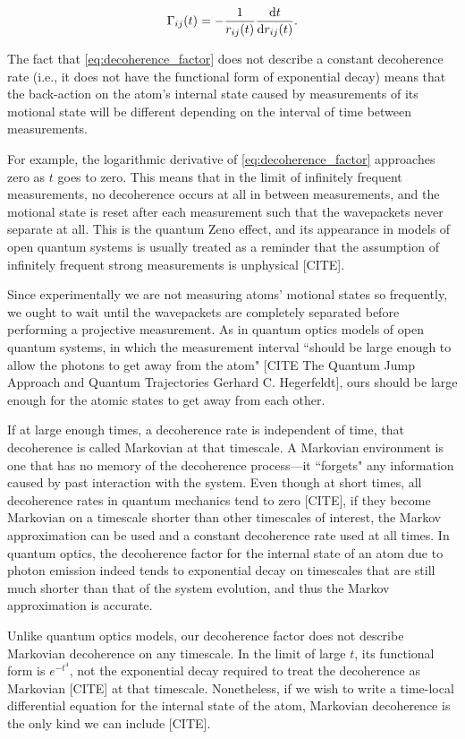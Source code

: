 \begin{align}
\Gamma_{ij}(t) = - \frac 1 {r_{ij}(t)} \dv t {r_{ij}(t)}.
\end{align}

 The fact that \eqref{eq:decoherence_factor} does not describe a constant decoherence rate (i.e., it does not have the functional form of exponential decay) means that the back-action on the atom's internal state caused by measurements of its motional state will be different depending on the interval of time between measurements.

For example, the logarithmic derivative of \eqref{eq:decoherence_factor} approaches zero as $t$ goes to zero. This means that in the limit of infinitely frequent measurements, no decoherence occurs at all in between measurements, and the motional state is reset after each measurement such that the wavepackets never separate at all. This is the quantum Zeno effect, and its appearance in models of open quantum systems is usually treated as a reminder that the assumption of infinitely frequent strong measurements is unphysical [CITE].

Since experimentally we are not measuring atoms' motional states so frequently, we ought to wait until the wavepackets are completely separated before performing a projective measurement. As in quantum optics models of open quantum systems, in which the measurement interval ``should be large enough to allow the photons to get away from the atom" [CITE The Quantum Jump Approach
and Quantum Trajectories Gerhard C. Hegerfeldt], ours should be large enough for the atomic states to get away from each other.

If at large enough times, a decoherence rate is independent of time, that decoherence is called Markovian at that timescale. A Markovian environment is one that has no memory of the decoherence process---it ``forgets" any information caused by past interaction with the system. Even though at short times, all decoherence rates in quantum mechanics tend to zero [CITE], if they become Markovian on a timescale shorter than other timescales of interest, the Markov approximation can be used and a constant decoherence rate used at all times. In quantum optics, the decoherence factor for the internal state of an atom due to photon emission indeed tends to exponential decay on timescales that are still much shorter than that of the system evolution, and thus the Markov approximation is accurate.

Unlike quantum optics models, our decoherence factor does not describe Markovian decoherence on any timescale. In the limit of large $t$, its functional form is $e^{-t^4}$, not the exponential decay required to treat the decoherence as Markovian [CITE] at that timescale. Nonetheless, if we wish to write a time-local differential equation for the internal state of the atom, Markovian decoherence is the only kind we can include [CITE].

